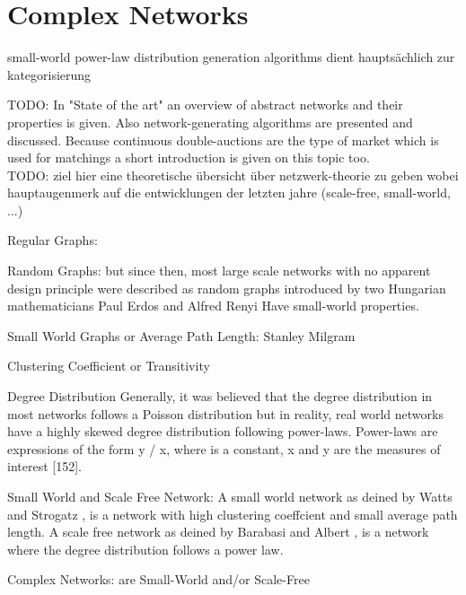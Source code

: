 \documentclass[../Bachelorarbeit.tex]{subfiles}
\begin{document}
\section{Complex Networks}
small-world
power-law distribution
generation algorithms
dient hauptsächlich zur kategorisierung
		
TODO:
In "State of the art" an overview of abstract networks and their properties is given. Also network-generating algorithms are presented and discussed. Because continuous double-auctions are the type of market which is used for matchings a short introduction is given on this topic too.\\

TODO: ziel hier eine theoretische übersicht über  netzwerk-theorie zu geben wobei hauptaugenmerk auf die entwicklungen der letzten jahre (scale-free, small-world, ...)

Regular Graphs: \citep[vgl.]{BarabasiAlbert_StatisticalMechanics} \citep[vgl.]{Newman_ComplexNetworks}

Random Graphs: but since then, most large scale networks with no apparent design principle were described as random graphs introduced by two Hungarian mathematicians Paul Erdos and Alfred Renyi \citep[vgl.]{ErdosRenyi_RandomGraphs} \citep[vgl.]{ErdosRenyi_EvolutionRandomGraphs} Have small-world properties.

Small World Graphs or Average Path Length: Stanley Milgram \citep{TraverMilgram_StudySmallWorld} \citep{Milgram_SmallWorld} \citep{Kleinberg_SmallworldAlgorithmic}

Clustering Coefficient or Transitivity \citep{WattsStrogatz_DynamicsSmallWorld}

Degree Distribution \citep{BarabasiAlbert_EmergenceScaling} Generally, it was believed that the degree distribution in most networks follows a
Poisson distribution but in reality, real world networks have a highly skewed degree distribution following power-laws. Power-laws are expressions of the form y / x, where is a constant, x and y are the measures of interest [152].

Small World and Scale Free Network: A small world network as deined by Watts and Strogatz \cite{WattsStrogatz_DynamicsSmallWorld}, is a network with high clustering coeffcient and small average path length. A scale free network as deined by Barabasi and Albert \citep{BarabasiAlbert_EmergenceScaling}, is a network where the degree distribution follows a power law.

Complex Networks: are Small-World and/or Scale-Free \citep{BarratWeigt_PropertiesSmallWorld} \citep{AmaralScalaStanley_ClassesSmallWorld}
\end{document}
